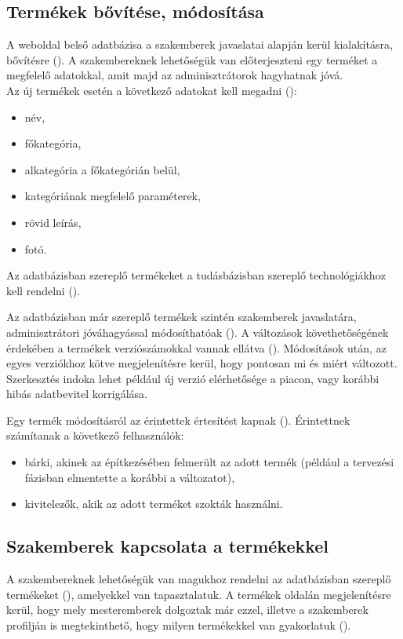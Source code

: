 \subsection{Termékek bővítése, módosítása}
A weboldal belső adatbázisa a szakemberek javaslatai alapján kerül kialakításra, bővítésre (). A szakembereknek lehetőségük van előterjeszteni egy terméket a megfelelő adatokkal, amit majd az adminisztrátorok hagyhatnak jóvá. \\
Az új termékek esetén a következő adatokat kell megadni ():
\begin{itemize}
    \item név,
    \item főkategória,
    \item alkategória a főkategórián belül,
    \item kategóriának megfelelő paraméterek,
    \item rövid leírás,
    \item fotó.
\end{itemize}

 Az adatbázisban szereplő termékeket a tudásbázisban szereplő technológiák\-hoz kell rendelni ().

Az adatbázisban már szereplő termékek szintén szakemberek javaslatára, adminisztrátori jóváhagyással módosíthatóak (). A változások követhetőségének érdekében a termékek verziószámokkal vannak ellátva (). Módosítások után, az egyes verziókhoz kötve megjelenítésre kerül, hogy pontosan mi és miért változott. Szerkesztés indoka lehet például új verzió elérhetősége a piacon, vagy korábbi hibás adatbevitel korrigálása.


Egy termék módosításról az érintettek értesítést kapnak (). Érintettnek számí\-tanak a következő felhasználók:
\begin{itemize}
    \item bárki, akinek az építkezésében felmerült az adott termék (például a tervezési fázisban elmentette a korábbi a változatot),
    \item kivitelezők, akik az adott terméket szokták használni.
\end{itemize}


\subsection{Szakemberek kapcsolata a termékekkel}
A szakembereknek lehetőségük van magukhoz rendelni az adatbázisban szereplő termékeket (), amelyekkel van tapasztalatuk. A termékek oldalán megjelenítésre kerül, hogy mely mesteremberek dolgoztak már ezzel, illetve a szakemberek profilján is megtekinthető, hogy milyen termékekkel van gyakorlatuk ().

